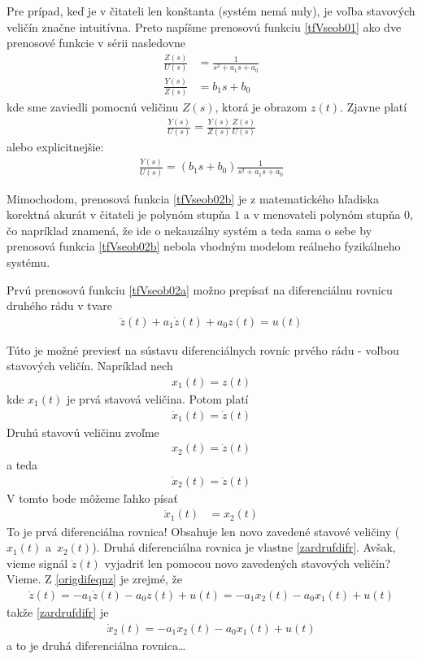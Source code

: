 \documentclass[a4paper, 10pt, ]{article}
\begin{document}
Pre prípad, keď je v čitateli len konštanta (systém nemá nuly), je voľba stavových veličín značne intuitívna. Preto napíšme prenosovú funkciu \eqref{tfVseob01} ako dve prenosové funkcie v sérii nasledovne
\begin{align}
	\frac{Z(s)}{U(s)} &= \frac{1}{ s^2 + a_1 s + a_0} \label{tfVseob02a} \\
    \frac{Y(s)}{Z(s)} &= b_1 s + b_0 \label{tfVseob02b}
\end{align}
kde sme zaviedli pomocnú veličinu $Z(s)$, ktorá je obrazom $z(t)$. Zjavne platí
\begin{align}
    \frac{Y(s)}{U(s)} = \frac{Y(s)}{Z(s)} \frac{Z(s)}{U(s)}
\end{align}
alebo explicitnejšie:
\begin{align}
    \frac{Y(s)}{U(s)} = \left( b_1 s + b_0 \right) \frac{1}{ s^2 + a_1 s + a_0}
\end{align}

Mimochodom, prenosová funkcia \eqref{tfVseob02b} je z matematického hľadiska korektná akurát v čitateli je polynóm stupňa $1$ a v menovateli polynóm stupňa $0$, čo napríklad znamená, že ide o nekauzálny systém a teda sama o sebe by prenosová funkcia \eqref{tfVseob02b} nebola vhodným modelom reálneho fyzikálneho systému.

Prvú prenosovú funkciu \eqref{tfVseob02a} možno prepísať na diferenciálnu rovnicu druhého rádu v tvare
\begin{align} \label{origdifeqnz}
	\ddot z(t) + a_1 \dot z(t) + a_0 z(t) = u(t)
\end{align}

Túto je možné previesť na sústavu diferenciálnych rovníc prvého rádu - voľbou stavových veličín. Napríklad nech
\begin{align}
	x_1(t) = z(t)
\end{align}
kde $x_1(t)$ je prvá stavová veličina. Potom platí
\begin{align}
	\dot x_1(t) = \dot z(t)
\end{align}
Druhú stavovú veličinu zvoľme
\begin{align}
	x_2(t) = \dot z(t)
\end{align}
a teda
\begin{align} \label{zardrufdifr}
	\dot x_2(t) = \ddot z(t)
\end{align}
V tomto bode môžeme ľahko písať
\begin{align}
	\dot x_1(t) &= x_2(t)
\end{align}
To je prvá diferenciálna rovnica! Obsahuje len novo zavedené stavové veličiny ($x_1(t)$ a~$x_2(t)$). Druhá diferenciálna rovnica je vlastne \eqref{zardrufdifr}. Avšak, vieme signál $\ddot z(t)$ vyjadriť len pomocou novo zavedených stavových veličín? Vieme. Z \eqref{origdifeqnz} je zrejmé, že
\begin{align}
	\ddot z(t) = - a_1 \dot z(t) - a_0 z(t) + u(t) = - a_1 x_2(t) - a_0 x_1(t) + u(t)
\end{align}
takže \eqref{zardrufdifr} je
\begin{align}
	\dot x_2(t) =  - a_1 x_2(t) - a_0 x_1(t) + u(t)
\end{align}
a to je druhá diferenciálna rovnica\ldots
\end{document}
